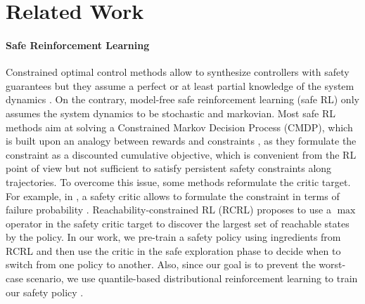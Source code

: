 \section{Related Work}
\label{section:related_work}

\paragraph{\textbf{Safe Reinforcement Learning}}
Constrained optimal control methods allow to synthesize controllers with safety guarantees but they assume a perfect or at least partial knowledge of the system dynamics \cite{CBF_th_2019,learningbasedMPCkoller2019,safe_control_certificates_dawson2022safe}. 
On the contrary, model-free safe reinforcement learning (safe RL) only assumes
the system dynamics to be stochastic and markovian. 
Most safe RL methods aim at solving a Constrained Markov Decision Process (CMDP),
which is built upon an analogy between rewards and constraints
\cite{AltmanCMDP,ha2020SACLagLevine,2015safeRLComprehensive,achiam2017CPO,lyapunovbased_policy_gradient_chow2019},
as they formulate the constraint as a discounted cumulative objective, which is convenient 
from the RL point of view but not sufficient to satisfy persistent safety constraints along trajectories.
To overcome this issue, some methods reformulate the critic target. For example, in \cite{2020safetyCritic}, a safety critic allows to formulate the constraint in terms of failure probability \cite{2020safetyCritic}. 
Reachability-constrained RL (RCRL) \cite{RCRL2022} proposes to use a $\max$ operator in the safety critic target to discover 
the largest set of reachable states by the policy.
In our work, we pre-train a safety policy using ingredients from RCRL and then use the critic in the
safe exploration phase to decide when to switch from one policy to another.
Also, since our goal is to prevent the worst-case scenario,
we use quantile-based distributional reinforcement learning to train our safety policy 
\cite{QR-DQN,WorstCasePG2019,WCSAC2021}.

